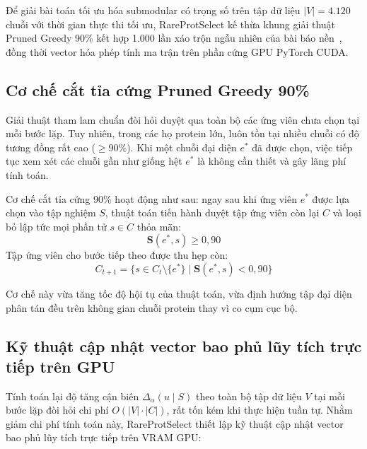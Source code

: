 Để giải bài toán tối ưu hóa submodular có trọng số trên tập dữ liệu $|V| = 4.120$ chuỗi với thời gian thực thi tối ưu, RareProtSelect kế thừa khung giải thuật Pruned Greedy 90\% kết hợp 1.000 lần xáo trộn ngẫu nhiên của bài báo nền~\cite{nguyen2025}, đồng thời vector hóa phép tính ma trận trên phần cứng GPU PyTorch CUDA.

\subsection{Cơ chế cắt tỉa cứng Pruned Greedy 90\%}
\label{subsec:pruning_mechanism}

Giải thuật tham lam chuẩn đòi hỏi duyệt qua toàn bộ các ứng viên chưa chọn tại mỗi bước lặp. Tuy nhiên, trong các họ protein lớn, luôn tồn tại nhiều chuỗi có độ tương đồng rất cao ($\ge 90\%$). Khi một chuỗi đại diện $e^*$ đã được chọn, việc tiếp tục xem xét các chuỗi gần như giống hệt $e^*$ là không cần thiết và gây lãng phí tính toán.

Cơ chế cắt tỉa cứng 90\% hoạt động như sau: ngay sau khi ứng viên $e^*$ được lựa chọn vào tập nghiệm $S$, thuật toán tiến hành duyệt tập ứng viên còn lại $C$ và loại bỏ lập tức mọi phần tử $s \in C$ thỏa mãn:
\begin{equation}
\label{eq:pruning_condition}
\mathbf{S}(e^*, s) \ge 0{,}90
\end{equation}
Tập ứng viên cho bước tiếp theo được thu hẹp còn:
\begin{equation}
C_{t+1} = \{s \in C_t \setminus \{e^*\} \mid \mathbf{S}(e^*, s) < 0{,}90\}
\end{equation}

Cơ chế này vừa tăng tốc độ hội tụ của thuật toán, vừa định hướng tập đại diện phân tán đều trên không gian chuỗi protein thay vì co cụm cục bộ.

\subsection{Kỹ thuật cập nhật vector bao phủ lũy tích trực tiếp trên GPU}
\label{subsec:incremental_gain}

Tính toán lại độ tăng cận biên $\Delta_\alpha(u \mid S)$ theo toàn bộ tập dữ liệu $V$ tại mỗi bước lặp đòi hỏi chi phí $O(|V| \cdot |C|)$, rất tốn kém khi thực hiện tuần tự. Nhằm giảm chi phí tính toán này, RareProtSelect thiết lập kỹ thuật cập nhật vector bao phủ lũy tích trực tiếp trên VRAM GPU:

